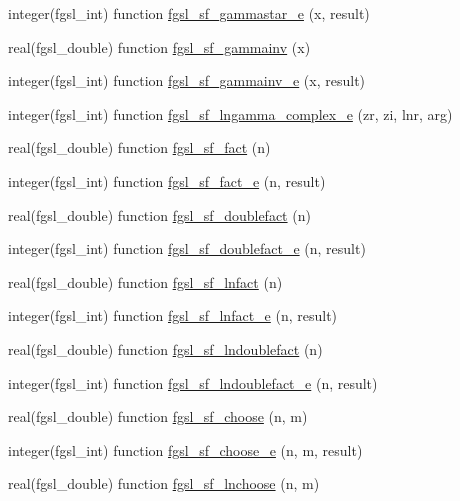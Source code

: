 \begin{DoxyCompactItemize}
\item 
integer(fgsl\-\_\-int) function \hyperlink{specfunc_8finc_a697a45fa47f4ead4ff604d24d1ef3290}{fgsl\-\_\-sf\-\_\-gammastar\-\_\-e} (x, result)
\item 
real(fgsl\-\_\-double) function \hyperlink{specfunc_8finc_a5a0962bf114d408c81b897b2ca2ee2de}{fgsl\-\_\-sf\-\_\-gammainv} (x)
\item 
integer(fgsl\-\_\-int) function \hyperlink{specfunc_8finc_a363fd577d026f303770994c868fabead}{fgsl\-\_\-sf\-\_\-gammainv\-\_\-e} (x, result)
\item 
integer(fgsl\-\_\-int) function \hyperlink{specfunc_8finc_aca9a851c2395f976dece945be9e0f590}{fgsl\-\_\-sf\-\_\-lngamma\-\_\-complex\-\_\-e} (zr, zi, lnr, arg)
\item 
real(fgsl\-\_\-double) function \hyperlink{specfunc_8finc_ab03fa6d812137aa04d0ca36921fd159e}{fgsl\-\_\-sf\-\_\-fact} (n)
\item 
integer(fgsl\-\_\-int) function \hyperlink{specfunc_8finc_ad79b4ad84aa27db38dec1c03c406198b}{fgsl\-\_\-sf\-\_\-fact\-\_\-e} (n, result)
\item 
real(fgsl\-\_\-double) function \hyperlink{specfunc_8finc_afe9f831cfcd997212fbd82604c0ac4d8}{fgsl\-\_\-sf\-\_\-doublefact} (n)
\item 
integer(fgsl\-\_\-int) function \hyperlink{specfunc_8finc_a4a3f40584ccc4237ad1ad6c849fe9e57}{fgsl\-\_\-sf\-\_\-doublefact\-\_\-e} (n, result)
\item 
real(fgsl\-\_\-double) function \hyperlink{specfunc_8finc_a4b7229cc02a457d012f56e0e67cfe206}{fgsl\-\_\-sf\-\_\-lnfact} (n)
\item 
integer(fgsl\-\_\-int) function \hyperlink{specfunc_8finc_a81a651d61889020c1d9960f5df422c61}{fgsl\-\_\-sf\-\_\-lnfact\-\_\-e} (n, result)
\item 
real(fgsl\-\_\-double) function \hyperlink{specfunc_8finc_a673eb36e50bde3322bd3579a0689fd23}{fgsl\-\_\-sf\-\_\-lndoublefact} (n)
\item 
integer(fgsl\-\_\-int) function \hyperlink{specfunc_8finc_a3d0c83939347006a120f91d4a1a31818}{fgsl\-\_\-sf\-\_\-lndoublefact\-\_\-e} (n, result)
\item 
real(fgsl\-\_\-double) function \hyperlink{specfunc_8finc_afb59552f4c03d4ca967861276ee330af}{fgsl\-\_\-sf\-\_\-choose} (n, m)
\item 
integer(fgsl\-\_\-int) function \hyperlink{specfunc_8finc_a2ea70000ea563e0e5b88d33ec5a28225}{fgsl\-\_\-sf\-\_\-choose\-\_\-e} (n, m, result)
\item 
real(fgsl\-\_\-double) function \hyperlink{specfunc_8finc_a21b8069a2cd450ab9d95ae8677d0ddf8}{fgsl\-\_\-sf\-\_\-lnchoose} (n, m)

\end{DoxyCompactItemize}
